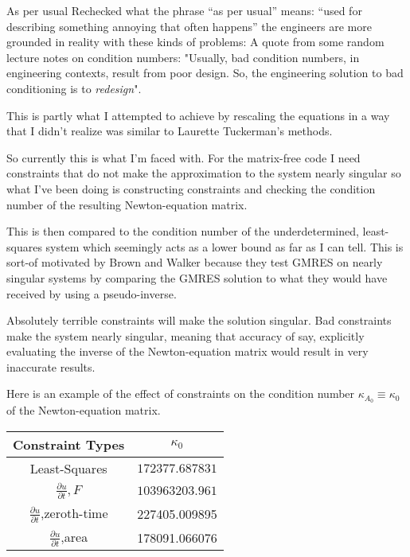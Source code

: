 \begin{description}
{As per usual
{Rechecked what the phrase ``as per usual''  means: ``used for
describing something annoying that often happens''}
 the engineers are more grounded in reality with these kinds of problems: A quote from some random
lecture notes on condition numbers: "Usually, bad condition numbers, in engineering contexts, result from poor design. So, the engineering solution to
bad conditioning is to \emph{redesign}".

This is partly what I attempted to achieve by rescaling the equations in a way
that I didn't realize was similar to Laurette Tuckerman's methods.

So currently this is what I'm faced with. For the matrix-free code I need constraints that do not make the approximation to the system nearly singular
so what I've been doing is constructing constraints and checking the condition
number of the resulting Newton-equation matrix.

This is then compared to the condition number of the underdetermined, least-squares system which seemingly acts as a lower bound as far as I can tell.
This is sort-of motivated by Brown and Walker because they test GMRES on nearly singular systems by comparing the GMRES solution to what they would have received by using a pseudo-inverse.

Absolutely terrible constraints will make the solution singular. Bad constraints
make the system nearly singular, meaning that accuracy of say, explicitly evaluating the inverse of the Newton-equation matrix would result in very inaccurate results.

Here is an example of the effect of constraints on the condition number $\kappa_{A_0} \equiv \kappa_0$ of the Newton-equation matrix.

\begin{table}
\centering
\begin{tabular}{c|c}
Constraint Types & $\kappa_0$   \\
\hline
Least-Squares  & $172377.687831$ \\
$\frac{\partial u}{\partial t},F$  & $103963203.961$ \\
$\frac{\partial u}{\partial t}$,zeroth-time &  227405.009895\\
$\frac{\partial u}{\partial t}$,area &  178091.066076\\
\hline
\end{tabular}
\end{table}


}
\end{description}
